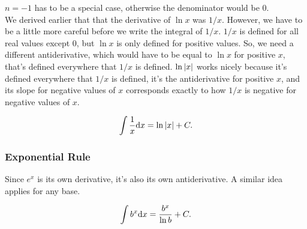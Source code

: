 \noindent
$n = -1$ has to be a special case, otherwise the denominator would be 0. \\

\noindent
We derived earlier that that the derivative of $\ln{x}$ was $1/x$.
However, we have to be a little more careful before we write the integral of $1/x$.
$1/x$ is defined for all real values except 0, but $\ln{x}$ is only defined for positive values.
So, we need a different antiderivative, which would have to be equal to $\ln{x}$ for positive $x$, that's defined everywhere that $1/x$ is defined.
$\ln{\lvert x \rvert}$ works nicely because it's defined everywhere that $1/x$ is defined, it's the antiderivative for positive $x$, and its slope for negative values of $x$ corresponds exactly to how $1/x$ is negative for negative values of $x$.
\begin{lemma}
	\begin{equation*}
		\int{\frac{1}{x}\mathrm{d} x} = \ln{\lvert x \rvert} + C.
	\end{equation*}
\end{lemma}

\subsubsection{Exponential Rule}
Since $e^x$ is its own derivative, it's also its own antiderivative.
A similar idea applies for any base.
\begin{lemma}
	\begin{equation*}
		\int{b^x\mathrm{d} x} = \frac{b^x}{\ln{b}} + C.
	\end{equation*}
\end{lemma}




